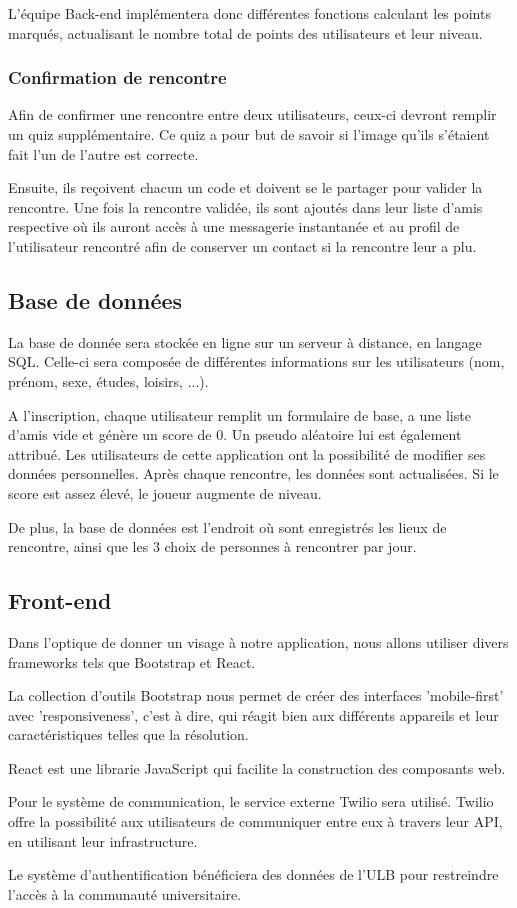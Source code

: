 \documentclass[10pt]{article}
\begin{document}
    L'équipe Back-end implémentera donc différentes fonctions calculant les points marqués, actualisant le nombre total de points des
    utilisateurs et leur niveau.
   \subsubsection{Confirmation de rencontre}
    Afin de confirmer une rencontre entre deux utilisateurs, ceux-ci devront remplir un quiz supplémentaire. 
    Ce quiz a pour but de savoir si l'image qu'ils s'étaient fait l'un de l'autre est correcte. 

    Ensuite, ils reçoivent chacun un code et doivent se le partager pour valider la rencontre. 
    Une fois la rencontre validée, ils sont ajoutés dans leur liste d'amis respective où ils auront accès à une messagerie 
    instantanée et au profil de l'utilisateur rencontré afin de conserver un contact si la rencontre leur a plu. 
    
  \subsection{Base de données}
   La base de donnée sera stockée en ligne sur un serveur à distance, en langage SQL. 
   Celle-ci sera composée de différentes informations sur les utilisateurs (nom, prénom, sexe, études, loisirs, ...).
   
   A l'inscription, chaque utilisateur remplit un formulaire de base, a une liste d'amis vide et génère un score de 0.
   Un pseudo aléatoire lui est également attribué. Les utilisateurs de cette application ont la possibilité de modifier ses données personnelles.
   Après chaque rencontre, les données sont actualisées. Si le score est assez élevé, le joueur augmente de niveau.

   De plus, la base de données est l'endroit où sont enregistrés les lieux de rencontre, ainsi que les 3 choix de personnes à rencontrer par jour.
   
  \subsection{Front-end}
   Dans l'optique de donner un visage à notre application, nous allons utiliser divers frameworks tels que Bootstrap et React.

   La collection d'outils Bootstrap nous permet de créer des interfaces 'mobile-first' avec 'responsiveness', c'est à dire, qui réagit bien
   aux différents appareils et leur caractéristiques telles que la résolution.

   React est une librarie JavaScript qui facilite la construction des composants web.

   Pour le système de communication, le service externe Twilio sera utilisé. Twilio offre la possibilité aux utilisateurs de communiquer
   entre eux à travers leur API, en utilisant leur infrastructure.

   Le système d'authentification bénéficiera des données de l'ULB pour restreindre l'accès à la communauté universitaire. 
\end{document}
